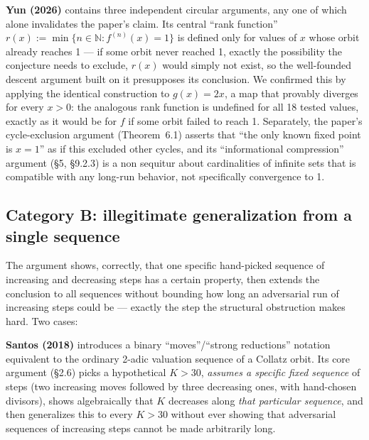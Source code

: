 \documentclass[11pt]{article}
\newcommand{\NN}{\mathbb{N}}
\begin{document}
\textbf{Yun (2026)} \cite{Yun2026} contains three independent circular
arguments, any one of which alone invalidates the paper's claim. Its
central ``rank function'' \(r(x) := \min\{n \in \NN : f^{(n)}(x) = 1\}\)
is defined only for values of \(x\) whose orbit already reaches 1 ---
if some orbit never reached 1, exactly the possibility the conjecture
needs to exclude, \(r(x)\) would simply not exist, so the well-founded
descent argument built on it presupposes its conclusion. We confirmed
this by applying the identical construction to \(g(x)=2x\), a map that
provably diverges for every \(x>0\): the analogous rank function is
undefined for all 18 tested values, exactly as it would be for \(f\) if
some orbit failed to reach 1. Separately, the paper's cycle-exclusion
argument (Theorem~6.1) asserts that ``the only known fixed point is
\(x=1\)'' as if this excluded other cycles, and its ``informational
compression'' argument (\S5, \S9.2.3) is a non sequitur about
cardinalities of infinite sets that is compatible with any long-run
behavior, not specifically convergence to 1.

\subsection{Category B: illegitimate generalization from a single sequence}
\label{sec:catB}

The argument shows, correctly, that one specific hand-picked sequence
of increasing and decreasing steps has a certain property, then
extends the conclusion to all sequences without bounding how long an
adversarial run of increasing steps could be --- exactly the step the
structural obstruction makes hard. Two cases:

\textbf{Santos (2018)} \cite{Santos2018} introduces a binary
``moves''/``strong reductions'' notation equivalent to the ordinary
2-adic valuation sequence of a Collatz orbit. Its core argument
(\S2.6) picks a hypothetical \(K>30\), \emph{assumes a specific fixed
sequence} of steps (two increasing moves followed by three decreasing
ones, with hand-chosen divisors), shows algebraically that \(K\)
decreases along \emph{that particular sequence}, and then generalizes
this to every \(K>30\) without ever showing that adversarial sequences
of increasing steps cannot be made arbitrarily long.
\end{document}
